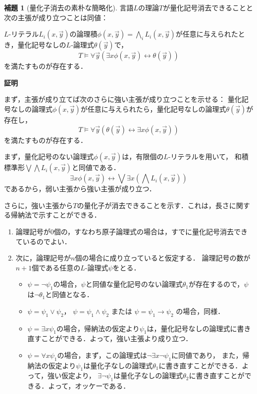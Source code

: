 \documentclass[uplatex, dvipdfmx]{jsarticle}
\makeatletter
\renewenvironment{proof}[1][\proofname]{\par
  \pushQED{\qed}%
  \normalfont \topsep6\p@\@plus6\p@\relax
  \trivlist
  \item\relax
  {\bfseries
  #1\@addpunct{.}}\hspace\labelsep\ignorespaces
}{%
  \popQED\endtrivlist\@endpefalse
}
\theoremstyle{definition}
\newtheorem{lemma}{補題}[section]
\renewcommand{\proofname}{\textbf{証明}}
\makeatother
\begin{document}
\begin{lemma}[量化子消去の素朴な簡略化] 
    言語$L$の理論$T$が量化記号消去できることと次の主張が成り立つことは同値：

    $L$-リテラル$L_i(x,\vec{y})$の論理積$\phi(x,\vec{y}) = \bigwedge_i L_i(x,\vec{y})$が任意に与えられたとき，量化記号なしの$L$-論理式$\theta(\vec{y})$で，
    \[T \models \forall \vec{y} ( \exists x \phi(x,\vec{y}) \leftrightarrow \theta(\vec{y}) )\]
    を満たすものが存在する．

\end{lemma}
\begin{proof}
    まず，主張が成り立てば次のさらに強い主張が成り立つことを示せる：
    量化記号なしの論理式$\phi(x,\vec{y})$が任意に与えられたら，量化記号なしの論理式$\theta(\vec{y})$が存在し，
    \[
        T \models \forall \vec{y} (\theta(\vec{y}) \leftrightarrow \exists x \phi(x, \vec{y}))
    \]
    を満たすものが存在する．

    まず，量化記号のない論理式$\phi(x,\vec{y})$は，有限個の$L$-リテラルを用いて，
    和積標準形$\bigvee \bigwedge L_i(x,\vec{y})$と同値である．
    \[
        \exists x \phi(x,\vec{y}) \leftrightarrow \bigvee \exists x  (\bigwedge L_i(x,\vec{y}))
    \]
    であるから，弱い主張から強い主張が成り立つ．

    さらに，強い主張から$T$の量化子が消去できることを示す．これは，長さに関する帰納法で示すことができる．
    \begin{enumerate}
        \item 論理記号が0個の，すなわち原子論理式の場合は，すでに量化記号消去できているのでよい．
        \item 次に，論理記号が$n$個の場合に成り立っていると仮定する．
        論理記号の数が$n+1$個である任意の$L$-論理式$\psi$をとる．
        \begin{itemize}
            \item $\psi = \lnot \psi_1$の場合，$\psi$と同値な量化記号のない論理式$\theta_1$が存在するので，$\psi$は$\lnot\theta_1$と同値となる．
            \item $\psi = \psi_1 \lor \psi_2$， $\psi = \psi_1 \land \psi_2$ または $\psi = \psi_1 \rightarrow \psi_2$ の場合，同様．
            \item $\psi = \exists x \psi_1$の場合，帰納法の仮定より$\psi_1$は，量化記号なしの論理式に書き直すことができる．よって，強い主張より成り立つ．
            \item $\psi = \forall x \psi_1$の場合，まず，この論理式は$\lnot \exists x \lnot \psi_1$に同値であり，
            また，帰納法の仮定より$\psi_1$は量化子なしの論理式$\theta_1$に書き直すことができる．よって，強い仮定より，
            $\exists \lnot \psi_1$は量化子なしの論理式$\theta_2$に書き直すことができる．よって，オッケーである．
        \end{itemize}
    \end{enumerate}
\end{proof}
\end{document}
